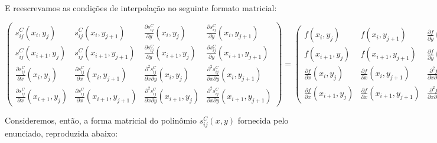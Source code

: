 \documentclass[11pt]{article}
\begin{document}
  E reescrevamos as condições de interpolação no seguinte formato matricial: \newline

  \hspace*{-2.9cm}
  {\footnotesize
    $\begin{pmatrix}
      s_{ij}^C(x_i, y_j)  & s_{ij}^C(x_i, y_{j + 1})             & \frac{\partial s_{ij}^C}{\partial y}(x_i, y_j) & \frac{\partial s_{ij}^C}{\partial y}(x_i, y_{j + 1}) \\
      s_{ij}^C(x_{i + 1}, y_j)  & s_{ij}^C(x_{i + 1}, y_{j + 1}) & \frac{\partial s_{ij}^C}{\partial y}(x_{i + 1}, y_j) & \frac{\partial s_{ij}^C}{\partial y}(x_{i + 1}, y_{j + 1}) \\
      \frac{\partial s_{ij}^C}{\partial x}(x_i, y_j) & \frac{\partial s_{ij}^C}{\partial x}(x_i, y_{j + 1}) & \frac{\partial^2 s_{ij}^C}{\partial x \partial y}(x_i, y_j) & \frac{\partial^2 s_{ij}^C}{\partial x \partial y}(x_i, y_{j + 1}) \\
      \frac{\partial s_{ij}^C}{\partial x}(x_{i + 1}, y_j)  & \frac{\partial s_{ij}^C}{\partial x}(x_{i + 1}, y_{j + 1}) & \frac{\partial^2 s_{ij}^C}{\partial x \partial y}(x_{i + 1}, y_j) & \frac{\partial^2 s_{ij}^C}{\partial x \partial y}(x_{i + 1}, y_{j + 1})
    \end{pmatrix} =
    \begin{pmatrix}
      f(x_i, y_j)                                   & f(x_i, y_{j + 1})                                   & \frac{\partial f}{\partial y}(x_i, y_j)                    & \frac{\partial f}{\partial y}(x_i, y_{j + 1}) \\
      f(x_{i + 1}, y_j)                             & f(x_{i + 1}, y_{j + 1})                             & \frac{\partial f}{\partial y}(x_{i + 1}, y_j)              & \frac{\partial f}{\partial y}(x_{i + 1}, y_{j + 1}) \\
      \frac{\partial f}{\partial x}(x_i, y_j)       & \frac{\partial f}{\partial x}(x_i, y_{j + 1})       & \frac{\partial^2 f}{\partial x \partial y}(x_i, y_j)       & \frac{\partial^2 f}{\partial x \partial y}(x_i, y_{j + 1}) \\
      \frac{\partial f}{\partial x}(x_{i + 1}, y_j) & \frac{\partial f}{\partial x}(x_{i + 1}, y_{j + 1}) & \frac{\partial^2 f}{\partial x \partial y}(x_{i + 1}, y_j) & \frac{\partial^2 f}{\partial x \partial y}(x_{i + 1}, y_{j + 1})
    \end{pmatrix}$}
    \newline

  Consideremos, então, a forma matricial do polinômio $s_{ij}^C(x, y)$ fornecida pelo enunciado, reproduzida abaixo:
\end{document}
